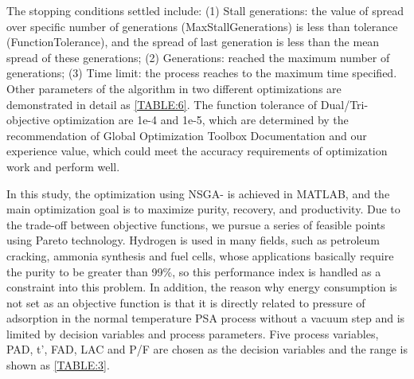 \documentclass[preprint,12pt]{elsarticle}
\begin{document}
The stopping conditions settled include: (1) Stall generations: the value of spread over specific number of generations (MaxStallGenerations) is less than tolerance (FunctionTolerance), and the spread of last generation is less than the mean spread of these generations; (2) Generations: reached the maximum number of generations; (3) Time limit: the process reaches to the maximum time specified. Other parameters of the algorithm in two different optimizations are demonstrated in detail as \cref{TABLE:6}. The function tolerance of Dual/Tri-objective optimization are 1e-4 and 1e-5, which are determined by the recommendation of Global Optimization Toolbox Documentation \cite{RN57} and our experience value, which could meet the accuracy requirements of optimization work and perform well.

In this study, the optimization using NSGA-\uppercase\expandafter{} is achieved in MATLAB, and the main optimization goal is to maximize purity, recovery, and productivity. Due to the trade-off between objective functions, we pursue a series of feasible points using Pareto technology. Hydrogen is used in many fields, such as petroleum cracking, ammonia synthesis and fuel cells, whose applications basically require the purity to be greater than 99\%\cite{RN58}, so this performance index is handled as a constraint into this problem. In addition, the reason why energy consumption is not set as an objective function is that it is directly related to pressure of adsorption in the normal temperature PSA process without a vacuum step\cite{RN11} and is limited by decision variables and process parameters. Five process variables, PAD, t', FAD, LAC and P/F are chosen as the decision variables and the range is shown as \cref{TABLE:3}.
\end{document}
